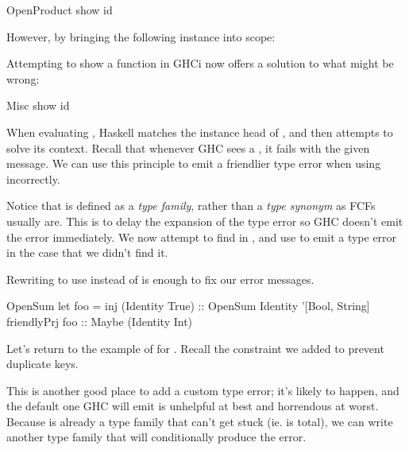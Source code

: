 \documentclass[book.tex]{subfiles}
\begin{document}
\begin{dorepl}{OpenProduct}
show id
\end{dorepl}

However, by bringing the following instance into scope:


Attempting to show a function in GHCi now offers a solution to what might be
wrong:

\begin{dorepl}{Misc}
show id
\end{dorepl}

When evaluating  , Haskell matches the instance head of , and then attempts to solve its context. Recall that whenever GHC sees
a , it fails with the given message. We can use this principle to
emit a friendlier type error when using  incorrectly.


Notice that  is defined as a \emph{type family}, rather
than a \emph{type synonym} as FCFs usually are. This is to delay the expansion
of the type error so GHC doesn't emit the error immediately. We now attempt to
find  in , and use  to emit a type error in the case
that we didn't find it.

Rewriting  to use  instead of
 is enough to fix our error messages.

\begin{dorepl}{OpenSum}
let foo = inj (Identity True) :: OpenSum Identity '[Bool, String]
friendlyPrj foo :: Maybe (Identity Int)
\end{dorepl}

Let's return to the example of  for . Recall the
 constraint we added to prevent duplicate keys.


This is another good place to add a custom type error; it's likely to happen,
and the default one GHC will emit is unhelpful at best and horrendous at worst.
Because  is already a type family that can't get stuck (ie. is
total), we can write another type family that will conditionally produce the
error.

\end{document}
